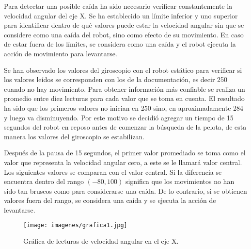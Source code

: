 Para detectar una posible caída ha sido necesario verificar constantemente la velocidad angular del eje X. Se ha establecido un límite inferior y uno superior para identificar dentro de qué valores puede estar la velocidad angular sin que se considere como una caída del robot, sino como efecto de su movimiento. En caso de estar fuera de los límites, se considera como una caída y el robot ejecuta la acción de movimiento para levantarse.  

Se han observado los valores del giroscopio con el robot estático para verificar si los valores leídos se corresponden con los de la documentación, es decir 250 cuando no hay movimiento. Para obtener información más confiable se realiza un promedio entre diez lecturas para cada valor que se toma en cuenta. El resultado ha sido que los primeros valores no inician en 250 sino, en aproximadamente 284 y luego va disminuyendo. Por este motivo se decidió agregar un tiempo de 15 segundos del robot en reposo antes de comenzar la búsqueda de la pelota, de esta manera los valores del giroscopio se estabilizan. 

Después de la pausa de 15 segundos, el primer valor promediado se toma como el valor que representa la velocidad angular cero, a este se le llamará valor central. Los siguientes valores se comparan con el valor central. Si la diferencia se encuentra dentro del rango $(-80,100)$ significa que los movimientos no han sido tan bruscos como para considerarse una caída. De lo contrario, si se obtienen valores fuera del rango, se considera una caída y se ejecuta la acción de levantarse.   


\begin{figure}[hbtp]
\centering
\texttt{[image: imagenes/grafica1.jpg]}
\caption{Gráfica de lecturas de velocidad angular en el eje X.}
\label{fig:grafica1}
\end{figure} 